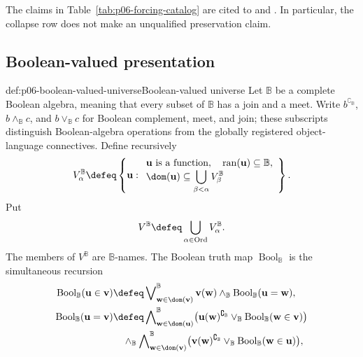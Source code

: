 The claims in Table~\ref{tab:p06-forcing-catalog} are cited to
\textcite[pp.~201--265]{Jech2003} and
\textcite[chs.~2, 4, and 5]{Bell2005}.  In particular, the collapse row does
not make an unqualified preservation claim.

\subsection{Boolean-valued presentation}

\begin{hbdefinition}{def:p06-boolean-valued-universe}{Boolean-valued universe}
Let \(\mathbb B\) be a complete Boolean algebra, meaning that every subset of
\(\mathbb B\) has a join and a meet.  Write
\(b^{\complement_{\mathbb B}}\), \(b\wedge_{\mathbb B}c\), and
\(b\vee_{\mathbb B}c\) for Boolean complement, meet, and join; these
subscripts distinguish Boolean-algebra operations from the globally
registered object-language connectives.  Define recursively
\[
  V^{\mathbb B}_\alpha
  \defeq\left\{\mathbf u:
      \begin{array}{l}
      \mathbf u\text{ is a function},\quad
      \operatorname{ran}(\mathbf u)\subseteq\mathbb B,\\
      \dom(\mathbf u)\subseteq
        \displaystyle\bigcup_{\beta<\alpha}V^{\mathbb B}_\beta
      \end{array}\right\}.
\]
Put
\[
  V^{\mathbb B}\defeq
  \bigcup_{\alpha\in\operatorname{Ord}}V^{\mathbb B}_\alpha.
\]
The members of \(V^{\mathbb B}\) are \(\mathbb B\)-names.  The Boolean truth
map \(\operatorname{Bool}_{\mathbb B}\) is the simultaneous recursion
\[
\begin{aligned}
 \operatorname{Bool}_{\mathbb B}(\mathbf u\in\mathbf v)
   &\defeq\mathop{\bigvee}\nolimits^{\mathbb B}_{\mathbf w\in\dom(\mathbf v)}
       \mathbf v(\mathbf w)\wedge_{\mathbb B}
       \operatorname{Bool}_{\mathbb B}(\mathbf u=\mathbf w),\\
 \operatorname{Bool}_{\mathbb B}(\mathbf u=\mathbf v)
   &\defeq\mathop{\bigwedge}\nolimits^{\mathbb B}_{\mathbf w\in\dom(\mathbf u)}
       \bigl(\mathbf u(\mathbf w)^{\complement_{\mathbb B}}\vee_{\mathbb B}
             \operatorname{Bool}_{\mathbb B}(\mathbf w\in\mathbf v)\bigr)\\
   &\quad\wedge_{\mathbb B}
     \mathop{\bigwedge}\nolimits^{\mathbb B}_{\mathbf w\in\dom(\mathbf v)}
       \bigl(\mathbf v(\mathbf w)^{\complement_{\mathbb B}}\vee_{\mathbb B}
             \operatorname{Bool}_{\mathbb B}(\mathbf w\in\mathbf u)\bigr),\\

\end{aligned}\]
\end{hbdefinition}
